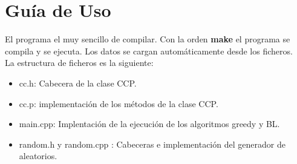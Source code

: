 \section{Guía de Uso}

El programa el muy sencillo de compilar. Con la orden \textbf{make} el programa se compila y se ejecuta. Los datos se cargan automáticamente desde los ficheros.\\
La estructura de ficheros es la siguiente:
\begin{itemize}
   \item cc.h: Cabecera de la clase CCP.
   \item cc.p: implementación de los métodos de la clase CCP.
   \item main.cpp: Implentación de la ejecución de los algoritmos greedy y BL.
   \item random.h y random.cpp : Cabeceras e implementación del generador de aleatorios.
\end{itemize}
